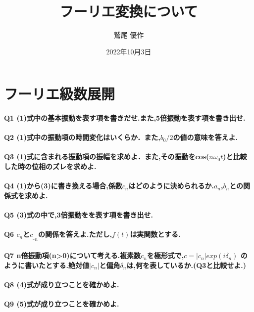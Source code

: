 \documentclass[dvipdfmx,titlepage,a4j]{jsarticle}  %
\title{フーリエ変換について}
\author{鷲尾 優作}
\date{2022年10月3日}
\begin{document}
\pagestyle{foot}

\maketitle

\section{フーリエ級数展開}

\paragraph{Q1 (1)式中の基本振動を表す項を書きだせ.また,5倍振動を表す項を書き出せ.}
\paragraph{Q2 (1)式中の振動項の時間変化はいくらか．また,$b_0/2$の値の意味を答えよ.}
\paragraph{Q3 (1)式に含まれる振動項の振幅を求めよ．また,その振動をcos($n\omega_0t$)と比較した時の位相のズレを求めよ.}
\paragraph{Q4 (1)から(3)に書き換える場合,係数$c_n$はどのように決められるか.$a_n$,$b_n$との関係式を求めよ.}
\paragraph{Q5 (3)式の中で,3倍振動をを表す項を書き出せ.}
\paragraph{Q6 $c_n$と${c_\_}_n$の関係を答えよ.ただし,$f(t)$は実関数とする.}
\paragraph{Q7 n倍振動項(n>0)について考える.複素数$c_n$を極形式で,$c = \left\lvert c_n \right\rvert exp(i\delta_n)$
  のように書いたとする.絶対値$\left\lvert c_n \right\rvert$と偏角$\delta_n$は,何を表しているか.(Q3と比較せよ.)}
\paragraph{Q8 (4)式が成り立つことを確かめよ.}
\paragraph{Q9 (5)式が成り立つことを確かめよ.}
\end{document}
